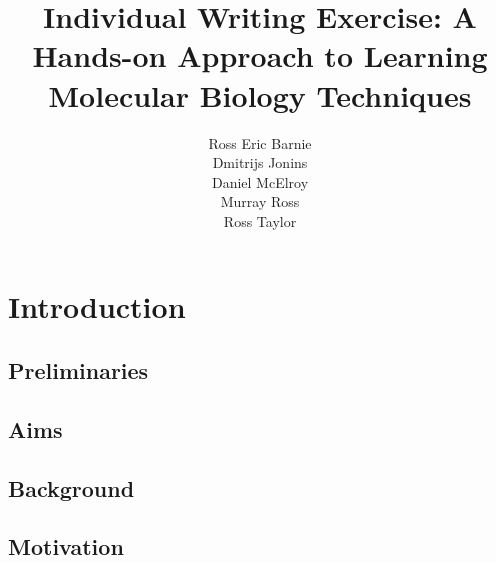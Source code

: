 \documentclass[a4paper]{article}
\title{Individual Writing Exercise: A Hands-on Approach to Learning
  Molecular Biology Techniques}
\author{
  Ross Eric Barnie \\
  Dmitrijs Jonins \\
  Daniel McElroy \\
  Murray Ross \\
  Ross Taylor
}
\date{}
\begin{document}
\maketitle

\section{Introduction}
\subsection{Preliminaries}
\subsection{Aims}
\subsection{Background}
\subsection{Motivation}



\end{document}
